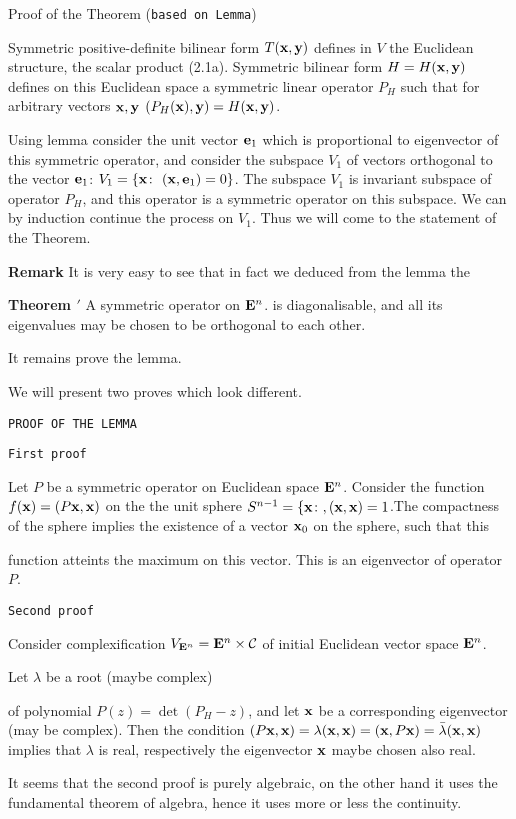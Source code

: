 {Proof of the Theorem ({\tt based on Lemma})}

Symmetric positive-definite bilinear form  $T({\bf x},{\bf y})$
defines in $V$ the Euclidean structure, the 
scalar product  (2.1a).
    Symmetric bilinear form $H=H({\bf x},{\bf y})$ defines on this
Euclidean space a symmetric linear operator 
$P_H$ such that  for arbitrary vectors ${\bf x},{\bf y}$
    $\left(P_H({\bf x}),{\bf y}\right)=H({\bf x},{\bf y})$.

Using lemma consider the unit vector
   ${\bf e}_1$ which is proportional to eigenvector of 
this symmetric operator, and 
  consider the subspace  $V_1$ of vectors orthogonal to the vector ${\bf e}_1$: $V_1=\{{\bf x}\colon\,\, ({\bf x},{\bf e}_1)=0\}$.
The subspace $V_1$ is invariant subspace of operator  $P_H$, 
and this operator is a 
symmetric operator on this subspace. 
We can by induction continue the process
on $V_1$.  Thus we will come to the statement 
of the Theorem.

{\bf Remark} It is very easy to see that in fact we deduced from 
the lemma  the 

{\bf Theorem $'$}  A  symmetric operator on ${\bf E}^n$.
is diagonalisable, and all its eigenvalues may be chosen
to be orthogonal to each other.

\medskip


It remains prove the lemma.

   We will present two proves which look different.

       {\tt PROOF OF THE LEMMA}



\centerline  {\tt First proof}

 Let $P$ be a symmetric operator 
on Euclidean space ${\bf E}^n$. Consider the function
  $f({\bf x})=(P{\bf x},{\bf x})$
on the the unit sphere  $S^{n-1}=\{{\bf x}\colon, ({\bf x},{\bf x})=1$.The compactness of the sphere implies the existence of a  vector ${\bf x}_0$ on the sphere,
      such that this
{function atteints the maximum on this vector.
  This  is an eigenvector of operator $P$.

\m


\centerline {\tt Second proof}


Consider complexification $V_{{\bf E}^n}={\bf E}^n\times {\cal C}$
  of initial Euclidean vector space ${\bf E}^n$.
   
Let $\lambda$ be a root (maybe complex)}
of polynomial  $P(z)=\det (P_H-z)$,
and let ${\bf x}$ be a corresponding  eigenvector (may be complex).
Then  the condition $(P{\bf x},{\bf x})=\lambda({\bf x},{\bf x})=
({\bf x},P{\bf x})=\bar {\lambda}({\bf x},{\bf x})$ implies that $\lambda$ is real,
respectively the eigenvector ${\bf x}$ maybe chosen also real.

\m
         
It seems that the second proof is purely algebraic, on the other 
hand it uses the fundamental theorem of algebra, hence it uses
more or less the continuity.





 \bye

